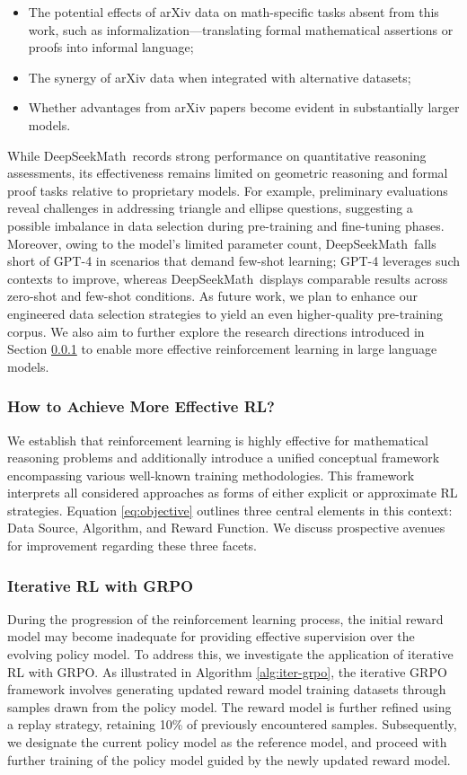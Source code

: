 \begin{itemize}[topsep=0pt]
    \item The potential effects of arXiv data on math-specific tasks absent from this work, such as informalization—translating formal mathematical assertions or proofs into informal language;
    \item The synergy of arXiv data when integrated with alternative datasets;
    \item Whether advantages from arXiv papers become evident in substantially larger models.
\end{itemize}

While DeepSeekMath~records strong performance on quantitative reasoning assessments, its effectiveness remains limited on geometric reasoning and formal proof tasks relative to proprietary models. For example, preliminary evaluations reveal challenges in addressing triangle and ellipse questions, suggesting a possible imbalance in data selection during pre-training and fine-tuning phases. Moreover, owing to the model’s limited parameter count, DeepSeekMath~falls short of GPT-4 in scenarios that demand few-shot learning; GPT-4 leverages such contexts to improve, whereas DeepSeekMath~displays comparable results across zero-shot and few-shot conditions. As future work, we plan to enhance our engineered data selection strategies to yield an even higher-quality pre-training corpus. We also aim to further explore the research directions introduced in Section \ref{sec:effec_rl} to enable more effective reinforcement learning in large language models.

\subsubsection{How to Achieve More Effective RL?}
\label{sec:effec_rl}
We establish that reinforcement learning is highly effective for mathematical reasoning problems and additionally introduce a unified conceptual framework encompassing various well-known training methodologies. This framework interprets all considered approaches as forms of either explicit or approximate RL strategies. Equation \ref{eq:objective} outlines three central elements in this context: Data Source, Algorithm, and Reward Function. We discuss prospective avenues for improvement regarding these three facets.

\subsubsection{Iterative RL with GRPO} During the progression of the reinforcement learning process, the initial reward model may become inadequate for providing effective supervision over the evolving policy model. To address this, we investigate the application of iterative RL with GRPO. As illustrated in Algorithm \ref{alg:iter-grpo}, the iterative GRPO framework involves generating updated reward model training datasets through samples drawn from the policy model. The reward model is further refined using a replay strategy, retaining 10\% of previously encountered samples. Subsequently, we designate the current policy model as the reference model, and proceed with further training of the policy model guided by the newly updated reward model.

